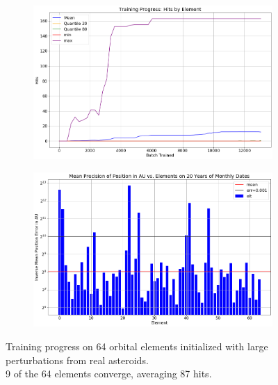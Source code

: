 \begin{figure}[h]
\begin{subfigure}[t]{\subfigwidth\textwidth}
\end{subfigure}
\hfill
\begin{subfigure}[t]{\subfigwidth\textwidth}
\centering
\includegraphics[width=\linewidth]{../figs/search_known/perturbed_large/learning_curve_hits.png}
\end{subfigure}
\medskip
\begin{subfigure}[t]{\textwidth}
\includegraphics[width=1.0\textwidth]{../figs/search_known/perturbed_large/near_ast_dist.png}
\end{subfigure}
\caption{Training progress on 64 orbital elements initialized with large perturbations from real asteroids.\\
9 of the 64 elements converge, averaging 87 hits.}
\end{figure}
\clearpage

